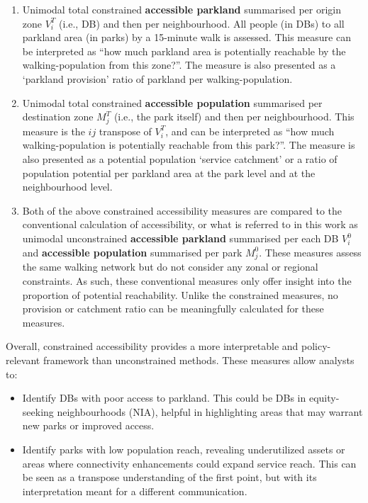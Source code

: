 \documentclass[
11pt, %
oneside, %
english, %
singlespacing, %
]{macthesis} %
\def\tightlist{}
\begin{document}
\begin{enumerate}
\def\labelenumi{\arabic{enumi}.}
\tightlist
\item
  Unimodal total constrained \textbf{accessible parkland} summarised per origin zone \(V_i^T\) (i.e., DB) and then per neighbourhood. All people (in DBs) to all parkland area (in parks) by a 15-minute walk is assessed. This measure can be interpreted as ``how much parkland area is potentially reachable by the walking-population from this zone?''. The measure is also presented as a `parkland provision' ratio of parkland per walking-population.
\item
  Unimodal total constrained \textbf{accessible population} summarised per destination zone \(M_j^T\) (i.e., the park itself) and then per neighbourhood. This measure is the \(ij\) transpose of \(V_i^T\), and can be interpreted as ``how much walking-population is potentially reachable from this park?''. The measure is also presented as a potential population `service catchment' or a ratio of population potential per parkland area at the park level and at the neighbourhood level.
\item
  Both of the above constrained accessibility measures are compared to the conventional calculation of accessibility, or what is referred to in this work as unimodal unconstrained \textbf{accessible parkland} summarised per each DB \(V_i^0\) and \textbf{accessible population} summarised per park \(M_j^0\). These measures assess the same walking network but do not consider any zonal or regional constraints. As such, these conventional measures only offer insight into the proportion of potential reachability. Unlike the constrained measures, no provision or catchment ratio can be meaningfully calculated for these measures.
\end{enumerate}

Overall, constrained accessibility provides a more interpretable and policy-relevant framework than unconstrained methods. These measures allow analysts to:

\begin{itemize}
\tightlist
\item
  Identify DBs with poor access to parkland. This could be DBs in equity-seeking neighbourhoods (NIA), helpful in highlighting areas that may warrant new parks or improved access.
\item
  Identify parks with low population reach, revealing underutilized assets or areas where connectivity enhancements could expand service reach. This can be seen as a transpose understanding of the first point, but with its interpretation meant for a different communication.
\end{itemize}
\end{document}
